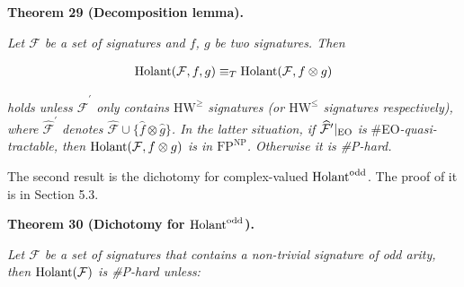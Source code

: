 

\par\medskip\noindent\textbf{
\textbf{Theorem 29}\textbf{ }(Decomposition lemma)\textbf{.}
}\par



\emph{Let $\mathcal{F}$ be a set of signatures and $f$, $g$ be two signatures. Then}\par


\[\begin{gathered}
\textup{{Holant}}(\mathcal{F},f,g)\equiv_{T}\textup{{Holant}}(\mathcal{F},f\otimes g)
\end{gathered}\]


\emph{holds unless $\widehat{\mathcal{F}}^{\prime}$ only contains $\text{HW}^{\geq}$ signatures (or $\text{HW}^{\leq}$ signatures respectively), where $\widehat{\mathcal{F}}^{\prime}$ denotes $\widehat{\mathcal{F}}\cup\{\widehat{f}\otimes\widehat{g}\}$.
In the latter situation, if $\widehat{\mathcal{F}}^{\prime}|_{\textup{{EO}}}$ is }\#EO\emph{-quasi-tractable, then $\textup{{Holant}}(\mathcal{F},f\otimes g)$ is in $\text{FP}^{\text{NP}}$. Otherwise it is \#P-hard.}\par






The second result is the dichotomy for complex-valued $\textup{{Holant}}^{\text{odd}}$. The proof of it is in Section 5.3.\par





\par\medskip\noindent\textbf{
\textbf{Theorem 30}\textbf{ }(Dichotomy for $\textup{{Holant}}^{\text{odd}}$)\textbf{.}
}\par



\emph{Let $\mathcal{F}$ be a set of signatures that contains a non-trivial signature of odd arity, then $\textup{{Holant}}(\mathcal{F})$ is \#P-hard unless:}\par


